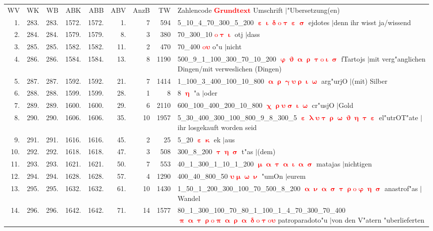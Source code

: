 \documentclass[a4paper,10pt,landscape]{article}
\begin{document}
\begin{tabular}{rrrrrrrrp{120mm}}
WV&WK&WB&ABK&ABB&ABV&AnzB&TW&Zahlencode \textcolor{red}{$\boldsymbol{Grundtext}$} Umschrift $|$"Ubersetzung(en)\\
1.&283.&283.&1572.&1572.&1.&7&594&5\_10\_4\_70\_300\_5\_200 \textcolor{red}{$\boldsymbol{\upepsilon\upiota\updelta\mathrm{o}\uptau\upepsilon\upsigma}$} ejdotes $|$denn ihr wisst ja/wissend\\
2.&284.&284.&1579.&1579.&8.&3&380&70\_300\_10 \textcolor{red}{$\boldsymbol{\mathrm{o}\uptau\upiota}$} otj $|$dass\\
3.&285.&285.&1582.&1582.&11.&2&470&70\_400 \textcolor{red}{$\boldsymbol{\mathrm{o}\upsilon}$} o"u $|$nicht\\
4.&286.&286.&1584.&1584.&13.&8&1190&500\_9\_1\_100\_300\_70\_10\_200 \textcolor{red}{$\boldsymbol{\upvarphi\upvartheta\upalpha\uprho\uptau\mathrm{o}\upiota\upsigma}$} fTartojs $|$mit verg"anglichen Dingen/mit verweslichen (Dingen)\\
5.&287.&287.&1592.&1592.&21.&7&1414&1\_100\_3\_400\_100\_10\_800 \textcolor{red}{$\boldsymbol{\upalpha\uprho\upgamma\upsilon\uprho\upiota\upomega}$} arg"urjO $|$(mit) Silber\\
6.&288.&288.&1599.&1599.&28.&1&8&8 \textcolor{red}{$\boldsymbol{\upeta}$} "a $|$oder\\
7.&289.&289.&1600.&1600.&29.&6&2110&600\_100\_400\_200\_10\_800 \textcolor{red}{$\boldsymbol{\upchi\uprho\upsilon\upsigma\upiota\upomega}$} cr"usjO $|$Gold\\
8.&290.&290.&1606.&1606.&35.&10&1957&5\_30\_400\_300\_100\_800\_9\_8\_300\_5 \textcolor{red}{$\boldsymbol{\upepsilon\uplambda\upsilon\uptau\uprho\upomega\upvartheta\upeta\uptau\upepsilon}$} el"utrOT"ate $|$ihr losgekauft worden seid\\
9.&291.&291.&1616.&1616.&45.&2&25&5\_20 \textcolor{red}{$\boldsymbol{\upepsilon\upkappa}$} ek $|$aus\\
10.&292.&292.&1618.&1618.&47.&3&508&300\_8\_200 \textcolor{red}{$\boldsymbol{\uptau\upeta\upsigma}$} t"as $|$(dem)\\
11.&293.&293.&1621.&1621.&50.&7&553&40\_1\_300\_1\_10\_1\_200 \textcolor{red}{$\boldsymbol{\upmu\upalpha\uptau\upalpha\upiota\upalpha\upsigma}$} matajas $|$nichtigen\\
12.&294.&294.&1628.&1628.&57.&4&1290&400\_40\_800\_50 \textcolor{red}{$\boldsymbol{\upsilon\upmu\upomega\upnu}$} "umOn $|$eurem\\
13.&295.&295.&1632.&1632.&61.&10&1430&1\_50\_1\_200\_300\_100\_70\_500\_8\_200 \textcolor{red}{$\boldsymbol{\upalpha\upnu\upalpha\upsigma\uptau\uprho\mathrm{o}\upvarphi\upeta\upsigma}$} anastrof"as $|$Wandel\\
14.&296.&296.&1642.&1642.&71.&14&1577&80\_1\_300\_100\_70\_80\_1\_100\_1\_4\_70\_300\_70\_400 \textcolor{red}{$\boldsymbol{\uppi\upalpha\uptau\uprho\mathrm{o}\uppi\upalpha\uprho\upalpha\updelta\mathrm{o}\uptau\mathrm{o}\upsilon}$} patroparadoto"u $|$von den V"atern "uberlieferten\\
\end{tabular}\medskip \\
\end{document}
